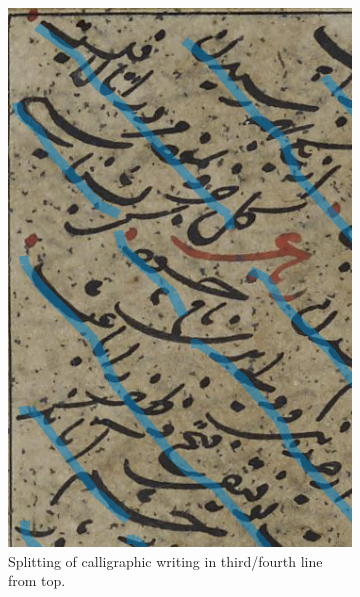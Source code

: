 \begin{figure}[ht!]
	\centering
	\begin{subfigure}[t]{.475\columnwidth}
		\includegraphics[width=\textwidth]{fail_calli.jpg}
		\caption{Splitting of calligraphic writing in third/fourth line from top.}
		\label{fig:calli}
	\end{subfigure}
	\hfill
	\begin{subfigure}[t]{.475\columnwidth}

\end{subfigure}
\end{figure}
